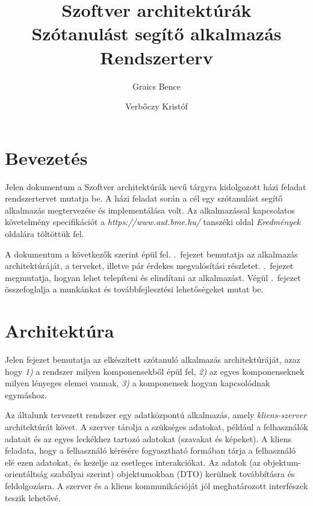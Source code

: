 \documentclass[11pt, a4paper]{article}
\begin{document}
\title{Szoftver architektúrák \\ Szótanulást segítő alkalmazás \\ \large{Rendszerterv}}
    \author{Graics Bence \and Verbőczy Kristóf}

    \maketitle
    
    \tableofcontents
    \newpage
    
    \section{Bevezetés}
    \label{sec:bevezetes}
    Jelen dokumentum a Szoftver architektúrák nevű tárgyra kidolgozott házi feladat rendszertervet mutatja be. A házi feladat során a cél egy szótanulást segítő alkalmazás megtervezése és implementálása volt. Az alkalmazással kapcsolatos követelmény specifikációt a \textit{https://www.aut.bme.hu/} tanszéki oldal \textit{Eredmények} oldalára töltöttük fel.
    
    A dokumentum a következők szerint épül fel. .~fejezet bemutatja az alkalmazás architektúráját, a terveket, illetve pár érdekes megvalósítási részletet. .~fejezet megmutatja, hogyan lehet telepíteni és elindítani az alkalmazást. Végül .~fejezet összefoglalja a munkánkat és továbbfejlesztési lehetőségeket mutat be.
    
    \section{Architektúra}
    \label{sec:architektúra}
    Jelen fejezet bemutatja az elkészített szótanuló alkalmazás architektúráját, azaz hogy \textit{1)} a rendszer milyen komponensekből épül fel, \textit{2)} az egyes komponenseknek milyen lényeges elemei vannak, \textit{3)} a komponensek hogyan kapcsolódnak egymáshoz.
    
    Az általunk tervezett rendszer egy adatközpontú alkalmazás, amely \emph{kliens-szerver} architektúrát követ. A szerver tárolja a szükséges adatokat, például a felhasználók adatait és az egyes leckékhez tartozó adatokat (szavakat és képeket). A kliens feladata, hogy a felhasználó kérésére fogyasztható formában tárja a felhasználó elé ezen adatokat, és kezelje az esetleges interakciókat. Az adatok (az objektum-orientáltság szabályai szerint) objektumokban (DTO) kerülnek továbbításra és feldolgozásra. A szerver és a kliens kommunikációját jól meghatározott interfészek teszik lehetővé.
    
\end{document}
